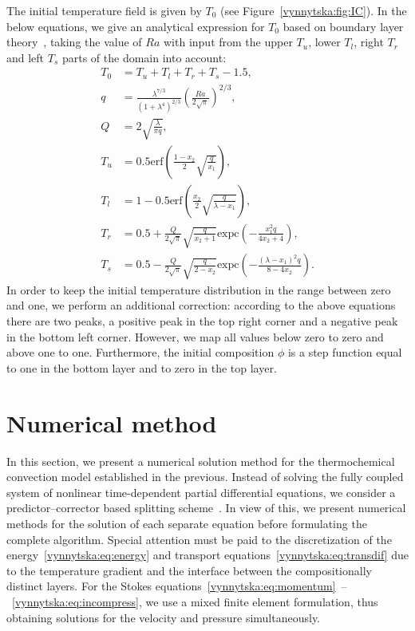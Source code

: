 The initial temperature field is given by $T_0$ (see
Figure~\ref{vynnytska:fig:IC}).  In the below equations, we
give an analytical expression for $T_0$ based on boundary layer
theory~\citep{KekenEtAl1997}, taking the value of $Ra$ with input from
the upper $T_u$, lower $T_l$, right $T_r$ and left $T_s$ parts of the
domain into account:
\begin{align}
    T_0 &= T_u + T_l + T_r + T_s - 1.5,
\\
  q &= \frac{\lambda^{7/3}}{\left(1 + \lambda^4 \right)^{2/3}} \left( \frac{Ra}{2 \sqrt{\pi}}\right)^{2/3},
\\
  Q & = 2\sqrt{\frac{\lambda}{\pi q}},
\\
    T_u &= 0.5 \mathrm{erf} \left( \frac{1-x_2}{2} \sqrt{\frac{q}{x_1}  } \right),
\\
    T_l &= 1 - 0.5 \mathrm{erf} \left( \frac{x_2}{2} \sqrt{\frac{q}{\lambda - x_1}  } \right),
\\
    T_r &= 0.5 + \frac{Q}{2\sqrt{\pi}} \sqrt{\frac{q}{x_{2} + 1} } \mathrm{expc} \left( - \frac{x_1^2 q}{4 x_2 + 4} \right),
\\
    T_s &= 0.5 - \frac{Q}{2\sqrt{\pi}} \sqrt{\frac{q}{2 - x_{2}} } \mathrm{expc} \left( - \frac{ \left(\lambda - x_1 \right)^2  q}{8 - 4 x_2} \right).
\end{align}
In order to keep the initial temperature distribution in the range
between zero and one, we perform an additional correction: according
to the above equations there are two peaks, a positive peak in the top
right corner and a negative peak in the bottom left corner. However, we map all values
below zero to zero and above one to one. Furthermore, the initial composition
$\phi$ is a step function equal to one in the bottom layer and to zero
in the top layer.


\section{Numerical method}

In this section, we present a numerical solution method for the
thermochemical convection model established in the previous. Instead
of solving the fully coupled system of nonlinear time-dependent partial
differential equations, we consider a predictor--corrector based splitting
scheme~\citep{BergKekenYuen1993, HansenEbel1988}. In view of this, we
present numerical methods for the solution of each separate equation
before formulating the complete algorithm. Special attention must be
paid to the discretization of the energy~\eqref{vynnytska:eq:energy}
and transport equations~\eqref{vynnytska:eq:transdif}
due to the temperature gradient and the interface
between the compositionally distinct layers. For the Stokes
equations~\eqref{vynnytska:eq:momentum}~--~\eqref{vynnytska:eq:incompress},
we use a mixed finite element formulation, thus obtaining solutions for
the velocity and pressure simultaneously.


